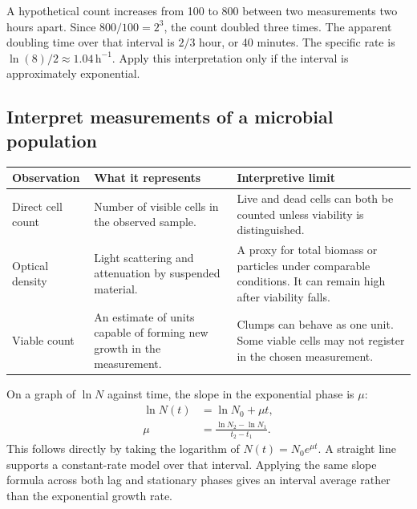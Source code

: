 \documentclass[12pt,a4paper]{article}
\begin{document}
\begin{tcolorbox}[examplebox, title={Read an illustrative population record}]
A hypothetical count increases from 100 to 800 between two measurements two hours apart. Since $800/100=2^3$, the count doubled three times. The apparent doubling time over that interval is $2/3$ hour, or 40 minutes. The specific rate is $\ln(8)/2\approx1.04\,\mathrm{h^{-1}}$. Apply this interpretation only if the interval is approximately exponential.
\end{tcolorbox}

\subsection{Interpret measurements of a microbial population}
\par\vspace{6pt}
\noindent\begin{tabularx}{\linewidth}{|B{3.4cm}|Y|Y|}
\hline
\textbf{Observation} & \textbf{What it represents} & \textbf{Interpretive limit} \\ \hline
Direct cell count & Number of visible cells in the observed sample. & Live and dead cells can both be counted unless viability is distinguished. \\ \hline
Optical density & Light scattering and attenuation by suspended material. & A proxy for total biomass or particles under comparable conditions. It can remain high after viability falls. \\ \hline
Viable count & An estimate of units capable of forming new growth in the measurement. & Clumps can behave as one unit. Some viable cells may not register in the chosen measurement. \\ \hline
\end{tabularx}\par

\begin{tcolorbox}[examplebox, title={Use an exponential-phase graph rather than one final count}]
On a graph of $\ln N$ against time, the slope in the exponential phase is $\mu$:
\[
\begin{aligned}
\ln N(t)&=\ln N_0+\mu t,\\
\mu&=\frac{\ln N_2-\ln N_1}{t_2-t_1}.
\end{aligned}
\]
This follows directly by taking the logarithm of $N(t)=N_0 e^{\mu t}$. A straight line supports a constant-rate model over that interval. Applying the same slope formula across both lag and stationary phases gives an interval average rather than the exponential growth rate.
\end{tcolorbox}
\end{document}
